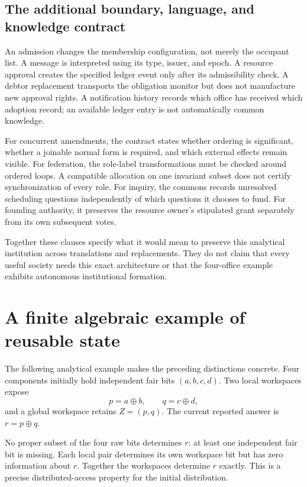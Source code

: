 \documentclass[11pt,letterpaper]{article}
\theoremstyle{plain}
\theoremstyle{definition}
\theoremstyle{remark}
\begin{document}
\subsection{The additional boundary, language, and knowledge contract}
An admission changes the membership configuration, not merely the occupant list. A message is interpreted using its type, issuer, and epoch. A resource approval creates the specified ledger event only after its admissibility check. A debtor replacement transports the obligation monitor but does not manufacture new approval rights. A notification history records which office has received which adoption record; an available ledger entry is not automatically common knowledge.

For concurrent amendments, the contract states whether ordering is significant, whether a joinable normal form is required, and which external effects remain visible. For federation, the role-label transformations must be checked around ordered loops. A compatible allocation on one invariant subset does not certify synchronization of every role. For inquiry, the commons records unresolved scheduling questions independently of which questions it chooses to fund. For founding authority, it preserves the resource owner's stipulated grant separately from its own subsequent votes.

Together these clauses specify what it would mean to preserve this analytical institution across translations and replacements. They do not claim that every useful society needs this exact architecture or that the four-office example exhibits autonomous institutional formation.

\section{A finite algebraic example of reusable state}\label{sec:worked}
The following analytical example makes the preceding distinctions concrete. Four components initially hold independent fair bits $(a,b,c,d)$. Two local workspaces expose
\[
p=a\oplus b,\qquad q=c\oplus d,
\]
and a global workspace retains $Z=(p,q)$. The current reported answer is $r=p\oplus q$.

No proper subset of the four raw bits determines $r$: at least one independent fair bit is missing. Each local pair determines its own workspace bit but has zero information about $r$. Together the workspaces determine $r$ exactly. This is a precise distributed-access property for the initial distribution.
\end{document}
